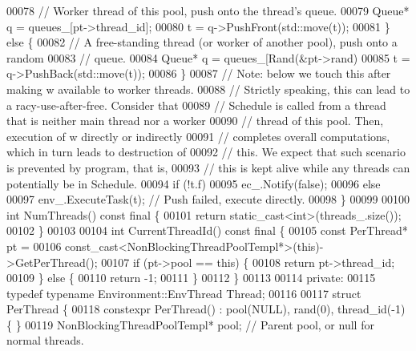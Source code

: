 \begin{DoxyCode}
{00078       \textcolor{comment}{// Worker thread of this pool, push onto the thread's queue.}
00079       Queue* q = queues\_[pt->thread\_id];
00080       t = q->PushFront(std::move(t));
00081     \} \textcolor{keywordflow}{else} \{
00082       \textcolor{comment}{// A free-standing thread (or worker of another pool), push onto a random}
00083       \textcolor{comment}{// queue.}
00084       Queue* q = queues\_[Rand(&pt->rand) %
00085       t = q->PushBack(std::move(t));
00086     \}
00087     \textcolor{comment}{// Note: below we touch this after making w available to worker threads.}
00088     \textcolor{comment}{// Strictly speaking, this can lead to a racy-use-after-free. Consider that}
00089     \textcolor{comment}{// Schedule is called from a thread that is neither main thread nor a worker}
00090     \textcolor{comment}{// thread of this pool. Then, execution of w directly or indirectly}
00091     \textcolor{comment}{// completes overall computations, which in turn leads to destruction of}
00092     \textcolor{comment}{// this. We expect that such scenario is prevented by program, that is,}
00093     \textcolor{comment}{// this is kept alive while any threads can potentially be in Schedule.}
00094     \textcolor{keywordflow}{if} (!t.f)
00095       ec\_.Notify(\textcolor{keyword}{false});
00096     \textcolor{keywordflow}{else}
00097       env\_.ExecuteTask(t);  \textcolor{comment}{// Push failed, execute directly.}
00098   \}
00099 
00100   \textcolor{keywordtype}{int} NumThreads() const final \{
00101     \textcolor{keywordflow}{return} \textcolor{keyword}{static\_cast<}\textcolor{keywordtype}{int}\textcolor{keyword}{>}(threads\_.size());
00102   \}
00103 
00104   \textcolor{keywordtype}{int} CurrentThreadId() const final \{
00105     \textcolor{keyword}{const} PerThread* pt =
00106         \textcolor{keyword}{const\_cast<}NonBlockingThreadPoolTempl*\textcolor{keyword}{>}(\textcolor{keyword}{this})->GetPerThread();
00107     \textcolor{keywordflow}{if} (pt->pool == \textcolor{keyword}{this}) \{
00108       \textcolor{keywordflow}{return} pt->thread\_id;
00109     \} \textcolor{keywordflow}{else} \{
00110       \textcolor{keywordflow}{return} -1;
00111     \}
00112   \}
00113 
00114  \textcolor{keyword}{private}:
00115   \textcolor{keyword}{typedef} \textcolor{keyword}{typename} Environment::EnvThread Thread;
00116 
00117   \textcolor{keyword}{struct }PerThread \{
00118     constexpr PerThread() : pool(NULL), rand(0), thread\_id(-1) \{ \}
00119     NonBlockingThreadPoolTempl* pool;  \textcolor{comment}{// Parent pool, or null for normal threads.}
}
\end{DoxyCode}
